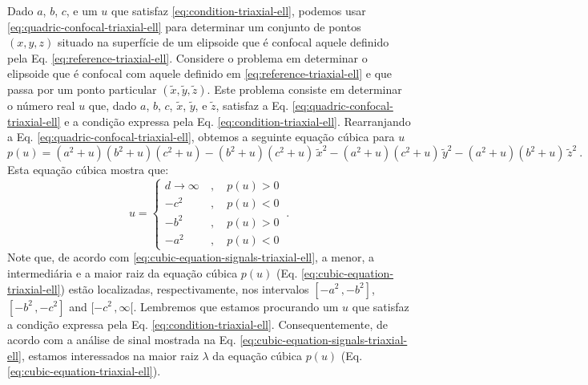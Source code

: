 Dado $a$, $b$, $c$, e um $u$ que satisfaz \ref{eq:condition-triaxial-ell}, 
podemos usar \ref{eq:quadric-confocal-triaxial-ell} para determinar um conjunto 
de pontos $(x, y, z)$ situado na superfície de um elipsoide que é confocal aquele
definido pela Eq. \ref{eq:reference-triaxial-ell}. 
Considere o problema em determinar o elipsoide que é confocal com aquele definido em
\ref{eq:reference-triaxial-ell} e que passa por um ponto particular $(\tilde{x}, \tilde{y}, \tilde{z})$.
Este problema consiste em determinar o número real $u$ que, dado  $a$, $b$, $c$, $\tilde{x}$, $\tilde{y}$, e $\tilde{z}$,
satisfaz a Eq. \ref{eq:quadric-confocal-triaxial-ell} e
a condição expressa pela Eq. \ref{eq:condition-triaxial-ell}.
Rearranjando a Eq. \ref{eq:quadric-confocal-triaxial-ell}, obtemos a seguinte equação cúbica para $u$
\begin{equation}
p(u) = (a^{2} + u)(b^{2} + u)(c^{2} + u) - (b^{2} + u)(c^{2} + u) \, \tilde{x}^{2}
- (a^{2} + u)(c^{2} + u) \, \tilde{y}^{2} - (a^{2} + u)(b^{2} + u) \, \tilde{z}^{2} \: .
\label{eq:cubic-equation-triaxial-ell}
\end{equation}
Esta equação cúbica mostra que:
\begin{equation}
u = \begin{cases}
d \to \infty \: &, \quad p(u) > 0 \\
-c^{2} \: &, \quad p(u) < 0 \\
-b^{2} \: &, \quad p(u) > 0 \\
-a^{2} \: &, \quad p(u) < 0
\end{cases} \: .
\label{eq:cubic-equation-signals-triaxial-ell}
\end{equation}
Note que, de acordo com \ref{eq:cubic-equation-signals-triaxial-ell},
a menor, a intermediária e a maior raiz da equação cúbica
$p(u)$ (Eq. \ref{eq:cubic-equation-triaxial-ell}) estão 
localizadas, respectivamente, nos intervalos $[ -a^{2} \, , -b^{2} ]$,
$[ -b^{2} \, , -c^{2} ]$ and $[ -c^{2} \, , \infty [$.
Lembremos que estamos procurando um $u$ que satisfaz a condição
expressa pela Eq. \ref{eq:condition-triaxial-ell}. 
Consequentemente, de acordo com a análise de sinal mostrada na Eq.
\ref{eq:cubic-equation-signals-triaxial-ell}, estamos interessados na 
maior raiz $\lambda$ da equação cúbica $p(u)$ (Eq.
\ref{eq:cubic-equation-triaxial-ell}).

